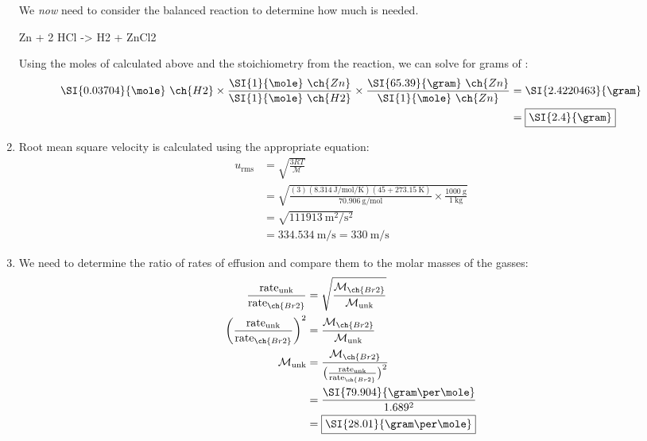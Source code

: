 \documentclass[11pt,letterpaper]{article}
\begin{document}
\begin{enumerate}[itemsep=2em,leftmargin=0pt,label=\textbf{\Alph*.}]
		We \emph{now} need to consider the balanced reaction to
		determine how much  is needed.
		\begin{reaction*}
			Zn\sld{} + 2 HCl\aq{} -> H2\gas{} + ZnCl2\aq{}
		\end{reaction*}
		Using the moles of  calculated above and the
		stoichiometry from the reaction, we can solve for grams of
		:
		\begin{align*}
			\SI{0.03704}{\mole}~\ch{H2} \times
			\frac{\SI{1}{\mole}~\ch{Zn}}{\SI{1}{\mole}~\ch{H2}}
			\times
			\frac{\SI{65.39}{\gram}~\ch{Zn}}{\SI{1}{\mole}~\ch{Zn}}
			&= \SI{2.4220463}{\gram} \\
			&= \boxed{\SI{2.4}{\gram}}
		\end{align*}
	\item Root mean square velocity is calculated using the appropriate
		equation:
		\begin{align*}
			u_\text{rms} &= \sqrt{\frac{3RT}{\mathcal{M}}} \\
			&=
			\sqrt{\frac{(3)(\SI{8.314}{\joule\per\mole\per\kelvin})(45
			+ 273.15~\si{\kelvin})}{\SI{70.906}{\gram\per\mole}}
			\times \frac{\SI{1000}{\gram}}{\SI{1}{\kilo\gram}}} \\
			&= \sqrt{\SI{111913}{\meter\squared\per\second\squared}} \\
			&= \SI{334.534}{\meter\per\second} =
			\boxed{\SI{330}{\meter\per\second}}
		\end{align*}
		
		\clearpage
		
	\item We need to determine the ratio of rates of effusion and compare
		them to the molar masses of the gasses:
		\begin{align*}
			\frac{\text{rate}_\text{unk}}{\text{rate}_{\ch{Br2}}} &=
			\sqrt{\frac{\mathcal{M}_{\ch{Br2}}}{\mathcal{M}_\text{unk}}}
			\\
			\bigg(\frac{\text{rate}_\text{unk}}{\text{rate}_{\ch{Br2}}}\bigg)^2
			&=
			\frac{\mathcal{M}_{\ch{Br2}}}{\mathcal{M}_\text{unk}} \\
			\mathcal{M}_\text{unk} &=
			\frac{\mathcal{M}_{\ch{Br2}}}{\big(\frac{\text{rate}_\text{unk}}{\text{rate}_{\ch{Br2}}}\big)^2}
			\\
			&= \frac{\SI{79.904}{\gram\per\mole}}{1.689^2} \\
			&= \boxed{\SI{28.01}{\gram\per\mole}}
		\end{align*}


\end{enumerate}
\end{document}
